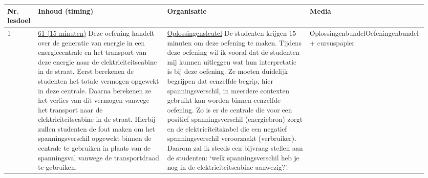 \begin{landscape}
		\begin{tabularx}{1.56\textwidth}{|p{1.5cm}|p{6cm}|X|p{4cm}|}
		\hline
		\textbf{Nr. lesdoel } & \textbf{Inhoud (timing)}  & \textbf{Organisatie } & \textbf{Media } \\ \hline
		1\newline 3\newline 4\newline 5 \newline 8&\underline{61 (15 minuten)}\newline
		Deze oefening handelt over de generatie van energie in een energiecentrale en het transport van deze energie naar de elektriciteitscabine in de straat. Eerst berekenen de studenten het totale vermogen opgewekt in deze centrale. Daarna berekenen ze het verlies van dit vermogen vanwege  het transport naar de elektriciteitscabine in de straat. Hierbij zullen studenten de fout maken om het spanningsverschil opgewekt binnen de centrale te gebruiken in plaats van de spanningsval vanwege de transportdraad te gebruiken. 
		
		& \underline{Oplossingensleutel}
		   De studenten krijgen 15 minuten om deze oefening te maken.  Tijdens deze oefening wil ik vooral dat de studenten mij kunnen uitleggen wat hun interpretatie is bij deze oefening. Ze moeten duidelijk begrijpen dat eenzelfde begrip, hier spanningsverschil, in meerdere contexten gebruikt kan worden binnen eenzelfde oefening. Zo is er de centrale die voor een positief spanningsverschil (energiebron) zorgt en de elektriciteitskabel die een negatief spanningsverschil veroorzaakt (verbruiker). Daarom zal ik steeds een bijvraag stellen aan de studenten: `welk spanningsverschil heb je nog in de elektriciteitscabine aanwezig?'.
		& Oplossingenbundel\newline Oefeningenbundel + cursuspapier
		\\ \hline
	\end{tabularx}
	

\end{landscape}
